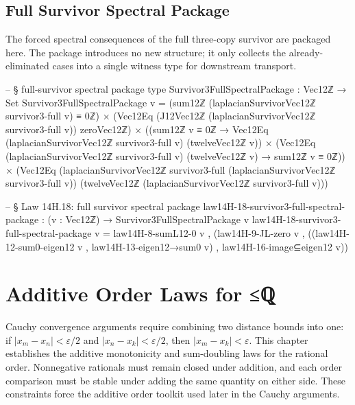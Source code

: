 \documentclass[11pt,a4paper]{book}
\def\leq{<=}%
\def\mathbb#1{#1}%
\def\texorpdfstring#1#2{#2}%
\begin{document}
\section{Full Survivor Spectral Package}

The forced spectral consequences of the full three-copy survivor are packaged here.
The package introduces no new structure; it only collects the already-eliminated
cases into a single witness type for downstream transport.

\begin{code}
  -- § full-survivor spectral package type
  Survivor3FullSpectralPackage : Vec12ℤ → Set
  Survivor3FullSpectralPackage v =
    (sum12ℤ (laplacianSurvivorVec12ℤ survivor3-full v) ≡ 0ℤ) ×
    (Vec12Eq (J12Vec12ℤ (laplacianSurvivorVec12ℤ survivor3-full v)) zeroVec12ℤ) ×
    ((sum12ℤ v ≡ 0ℤ → Vec12Eq (laplacianSurvivorVec12ℤ survivor3-full v) (twelveVec12ℤ v)) ×
     (Vec12Eq (laplacianSurvivorVec12ℤ survivor3-full v) (twelveVec12ℤ v) → sum12ℤ v ≡ 0ℤ)) ×
    (Vec12Eq (laplacianSurvivorVec12ℤ survivor3-full (laplacianSurvivorVec12ℤ survivor3-full v))
             (twelveVec12ℤ (laplacianSurvivorVec12ℤ survivor3-full v)))

  -- § Law 14H.18: full survivor spectral package
  law14H-18-survivor3-full-spectral-package : (v : Vec12ℤ) → Survivor3FullSpectralPackage v
  law14H-18-survivor3-full-spectral-package v =
    law14H-8-sumL12-0 v ,
    (law14H-9-JL-zero v ,
     ((law14H-12-sum0-eigen12 v , law14H-13-eigen12→sum0 v) ,
      law14H-16-image⊆eigen12 v))
\end{code}


\chapter{Additive Order Laws for \texorpdfstring{$\leq_{\mathbb{Q}}$}{≤ℚ}}
\label{ch:additive-order-laws}

Cauchy convergence arguments require combining two distance bounds into one:
if $|x_m - x_n| < \varepsilon/2$ and $|x_n - x_k| < \varepsilon/2$,
then $|x_m - x_k| < \varepsilon$.  This chapter establishes the additive
monotonicity and sum-doubling laws for the rational order.  Nonnegative
rationals must remain closed under addition, and each order comparison must be
stable under adding the same quantity on either side.  These constraints force
the additive order toolkit used later in the Cauchy arguments.
\end{document}
